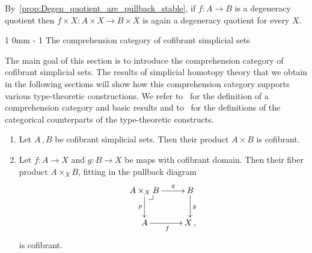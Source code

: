 \documentclass[reqno,10pt,a4paper,oneside,draft]{amsart}
\makeatletter
\renewcommand{\section}{\@startsection
{section}%
{1}%
{0mm}%
{-\baselineskip}%
{1\baselineskip}%
{\Large \bfseries}}%
\numberwithin{equation}{section}
\theoremstyle{mythm}
\theoremstyle{mydef}
\theoremstyle{myrmk}
\newcommand{\pullback}[1]{\save*!/#1-1.2pc/#1:(-1,1)@^{|-}\restore}
\newcommand{\drpullback}{\pullback{dr}}
\newcommand{\co}{\colon}
\makeatother
\begin{document}
By~\cref{prop:Degen_quotient_are_pullback_stable}, if $f \co A \rightarrow B$ is a degeneracy quotient  then $f \times X \co A \times X \rightarrow B \times X$ is again a degeneracy quotient for every $X$.


\section{The comprehension category of cofibrant simplicial sets}
\label{sec:basrp}

The main goal of this section is to introduce the comprehension category of cofibrant simplicial sets. The
results of simplicial homotopy theory that we obtain in the following sections will show how this 
comprehension category supports various type-theoretic constructions. We refer to~\cite{JacobsB:catltt} for the definition of a comprehension category and basic results and to~\cite{LumsdaineP:locuoc} for the
definitions of the categorical counterparts of the type-theoretic constructs.  


\begin{lemma}\label{lem:cofibrant_fiber_product} \hfill 
\begin{enumerate}[$(i)$] 
\item Let $A \, , B$ be cofibrant simplicial sets. Then their product $A \times B$ is cofibrant.
\item Let $f \co A \to X$ and $g \co B \to X$ be maps with  cofibrant domain. Then their
fiber product $A \times_X B$, fitting in the pullback diagram
\[
\xymatrix{
A \times_X B \drpullback \ar[r]^-{q} \ar[d]_-{p} & B \ar[d]^g \\
A \ar[r]_f & X \, ,}
\]
is cofibrant.
\end{enumerate}
\end{lemma}
\end{document}
